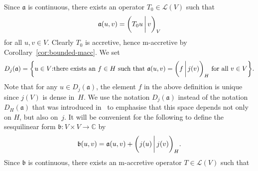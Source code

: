 \documentclass[a4paper,oneside,12pt]{amsart}
\theoremstyle{plain}
\theoremstyle{definition}
\begin{document}
Since ${{\mathfrak{{a}}}}$ is continuous, there exists an operator $T_0\in{\mathcal{L}}(V)$ such that
\[
    {{\mathfrak{{a}}}}(u,v) = {{\ifthenelse{\equal{auto}{auto}}{\left({T_0u}\mkern3mu{\biggm|}\mkern3mu {v}\right)}{}
\ifthenelse{\equal{auto}{b}}{\bigl({T_0u}\mkern3mu{\biggm|}\mkern3mu {v}\bigr)}{}
\ifthenelse{\equal{auto}{B}}{\Bigl({T_0u}\mkern3mu{\bigm|}\mkern3mu {v}\Bigr)}{}
}}_V
\]
for all $u,v\in V$. Clearly $T_0$ is accretive, hence {\ensuremath{\text{m}}}-accretive by Corollary~\ref{cor:bounded-macc}. We set
\[
    D_j({{\mathfrak{{a}}}}) = {{\ifthenelse{\equal{auto}{auto}}{\left\{{u\in V}{:} {\text{there exists an $f\in H$ such that ${{\mathfrak{{a}}}}(u,v) = {{\ifthenelse{\equal{auto}{auto}}{\left({f}\mkern3mu{\biggm|}\mkern3mu {j(v)}\right)}{}
\ifthenelse{\equal{auto}{b}}{\bigl({f}\mkern3mu{\biggm|}\mkern3mu {j(v)}\bigr)}{}
\ifthenelse{\equal{auto}{B}}{\Bigl({f}\mkern3mu{\bigm|}\mkern3mu {j(v)}\Bigr)}{}
}}_H$ for all $v\in V$}}\right\}}{}
\ifthenelse{\equal{auto}{b}}{\bigl\{{u\in V}{:} {\text{there exists an $f\in H$ such that ${{\mathfrak{{a}}}}(u,v) = {{\ifthenelse{\equal{auto}{auto}}{\left({f}\mkern3mu{\biggm|}\mkern3mu {j(v)}\right)}{}
\ifthenelse{\equal{auto}{b}}{\bigl({f}\mkern3mu{\biggm|}\mkern3mu {j(v)}\bigr)}{}
\ifthenelse{\equal{auto}{B}}{\Bigl({f}\mkern3mu{\bigm|}\mkern3mu {j(v)}\Bigr)}{}
}}_H$ for all $v\in V$}}\bigr\}}{}
\ifthenelse{\equal{auto}{B}}{\Bigl\{{u\in V}{:} {\text{there exists an $f\in H$ such that ${{\mathfrak{{a}}}}(u,v) = {{\ifthenelse{\equal{auto}{auto}}{\left({f}\mkern3mu{\biggm|}\mkern3mu {j(v)}\right)}{}
\ifthenelse{\equal{auto}{b}}{\bigl({f}\mkern3mu{\biggm|}\mkern3mu {j(v)}\bigr)}{}
\ifthenelse{\equal{auto}{B}}{\Bigl({f}\mkern3mu{\bigm|}\mkern3mu {j(v)}\Bigr)}{}
}}_H$ for all $v\in V$}}\Bigr\}}{}
}}.
\]
Note that for any $u\in D_j({{\mathfrak{{a}}}})$, the element $f$ in the above definition is unique 
since $j(V)$ is dense in~$H$.
We use the notation $D_j({{\mathfrak{{a}}}})$ instead of the notation $D_H({{\mathfrak{{a}}}})$ that
was introduced in~\cite{AtE12:sect-form} to emphasise that this space depends not only on $H$, but also on~$j$.
It will be convenient for the following to define the sesquilinear form ${{\mathfrak{{b}}}}\colon V\times V\to{\mathbb{C}}$ by 
\[
    {{\mathfrak{{b}}}}(u,v)={{\mathfrak{{a}}}}(u,v)+{{\ifthenelse{\equal{auto}{auto}}{\left({j(u)}\mkern3mu{\biggm|}\mkern3mu {j(v)}\right)}{}
\ifthenelse{\equal{auto}{b}}{\bigl({j(u)}\mkern3mu{\biggm|}\mkern3mu {j(v)}\bigr)}{}
\ifthenelse{\equal{auto}{B}}{\Bigl({j(u)}\mkern3mu{\bigm|}\mkern3mu {j(v)}\Bigr)}{}
}}_H.
\]
Since ${{\mathfrak{{b}}}}$ is continuous, there exists an {\ensuremath{\text{m}}}-accretive operator $T\in{\mathcal{L}}(V)$ such that
\end{document}
